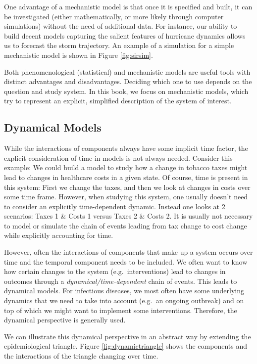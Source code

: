 \documentclass[]{book}
\theoremstyle{definition}
\theoremstyle{definition}
\theoremstyle{definition}
\theoremstyle{remark}
\begin{document}
One advantage of a mechanistic model is that once it is specified and
built, it can be investigated (either mathematically, or more likely
through computer simulations) without the need of additional data. For
instance, our ability to build decent models capturing the salient
features of hurricane dynamics allows us to forecast the storm
trajectory. An example of a simulation for a simple mechanistic model is
shown in Figure \ref{fig:sirsim}.

Both phenomenological (statistical) and mechanistic models are useful
tools with distinct advantages and disadvantages. Deciding which one to
use depends on the question and study system. In this book, we focus on
mechanistic models, which try to represent an explicit, simplified
description of the system of interest.

\subsection{Dynamical Models}\label{dynamical-models}

While the interactions of components always have some implicit time
factor, the explicit consideration of time in models is not always
needed. Consider this example: We could build a model to study how a
change in tobacco taxes might lead to changes in healthcare costs in a
given state. Of course, time is present in this system: First we change
the taxes, and then we look at changes in costs over some time frame.
However, when studying this system, one usually doesn't need to consider
an explicitly time-dependent dynamic. Instead one looks at 2 scenarios:
Taxes 1 \& Costs 1 versus Taxes 2 \& Costs 2. It is usually not
necessary to model or simulate the chain of events leading from tax
change to cost change while explicitly accounting for time.

However, often the interactions of components that make up a system
occurs over time and the temporal component needs to be included. We
often want to know how certain changes to the system
(e.g.~interventions) lead to changes in outcomes through a
\emph{dynamical/time-dependent} chain of events. This leads to dynamical
models. For infectious diseases, we most often have some underlying
dynamics that we need to take into account (e.g.~an ongoing outbreak)
and on top of which we might want to implement some interventions.
Therefore, the dynamical perspective is generally used.

We can illustrate this dynamical perspective in an abstract way by
extending the epidemiological triangle. Figure \ref{fig:dynamictriangle}
shows the components and the interactions of the triangle changing over
time.
\end{document}

